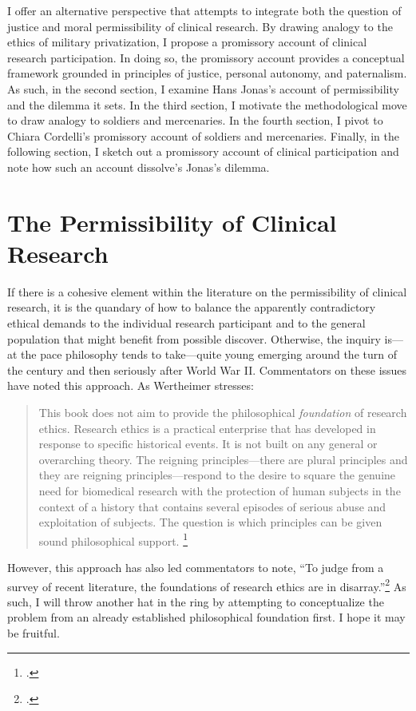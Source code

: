 \documentclass[letterpaper,notitlepage,12pt]{article}
\begin{document}
I offer an alternative perspective that attempts to integrate both the question
of justice and moral permissibility of clinical research.
By drawing analogy to the ethics of military privatization, I propose a
promissory account of clinical research participation.
In doing so, the promissory account provides a conceptual framework grounded in
principles of justice, personal autonomy, and paternalism.
As such, in the second section, I examine Hans Jonas's account of permissibility
and the dilemma it sets.
In the third section, I motivate the methodological move to draw analogy to
soldiers and mercenaries.
In the fourth section, I pivot to Chiara Cordelli's promissory account of
soldiers and mercenaries.
Finally, in the following section, I sketch out a promissory account of clinical
participation and note how such an account dissolve's Jonas's dilemma.

\section{The Permissibility of Clinical Research}

If there is a cohesive element within the literature on the permissibility of
clinical research, it is the quandary of how to balance the apparently
contradictory ethical demands to the individual research participant and to the
general population that might benefit from possible discover.
Otherwise, the inquiry is---at the pace philosophy tends to take---quite young
emerging around the turn of the  century and then seriously after World
War II.
Commentators on these issues have noted this approach.
As Wertheimer stresses: \begin{quotation}
This book does not aim to provide the philosophical \textit{foundation} of
research ethics. Research ethics is a practical enterprise that has developed in
response to specific historical events. It is not built on any general or
overarching theory. The reigning principles---there are plural principles and
they are reigning principles---respond to the desire to square the genuine need
for biomedical research with the protection of human subjects in the context of
a history that contains several episodes of serious abuse and exploitation of
subjects. The question is which principles can be given sound philosophical
support. \footcite[p. 3]{wertheimer_rethinking_2011}
\end{quotation}
However, this approach has also led commentators to note, ``To judge from a
survey of recent literature, the foundations of research ethics are in
disarray.''\footcite[p. 99]{london_two_2007}
As such, I will throw another hat in the ring by attempting to conceptualize the
problem from an already established philosophical foundation first.
I hope it may be fruitful.
\end{document}

